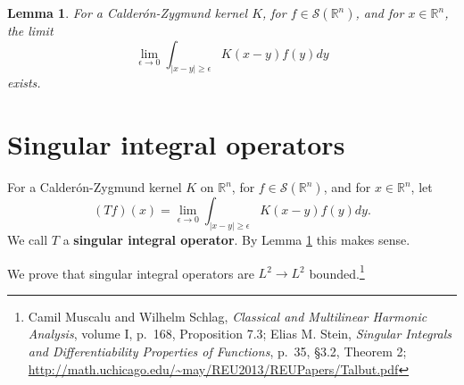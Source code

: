 \documentclass{article}
\newtheorem{lemma}[theorem]{Lemma}
\theoremstyle{definition}
\begin{document}
\begin{lemma}
For a Calder\'on-Zygmund kernel $K$, for $f \in \mathscr{S}(\mathbb{R}^n)$,  and for $x \in \mathbb{R}^n$, 
the limit
\[
\lim_{\epsilon \to 0} \int_{|x-y| \geq \epsilon} K(x-y) f(y) dy
\]
exists.
\label{CZK}
\end{lemma}



\section{Singular integral operators}
For a Calder\'on-Zygmund kernel $K$ on $\mathbb{R}^n$, for $f \in \mathscr{S}(\mathbb{R}^n)$, and for $x \in \mathbb{R}^n$, let
\[
(Tf)(x) = \lim_{\epsilon \to 0} \int_{|x-y| \geq \epsilon} K(x-y) f(y) dy.
\]
We call $T$ a \textbf{singular integral operator}. By Lemma \ref{CZK} this makes sense.

We prove that singular integral operators are $L^2 \to L^2$ bounded.\footnote{Camil Muscalu and Wilhelm Schlag, {\em Classical
and Multilinear Harmonic Analysis}, volume I, p.~168, Proposition 7.3;
Elias M. Stein, {\em Singular Integrals and Differentiability Properties of Functions},
p.~35, \S 3.2, Theorem 2; \url{http://math.uchicago.edu/~may/REU2013/REUPapers/Talbut.pdf}}
\end{document}
